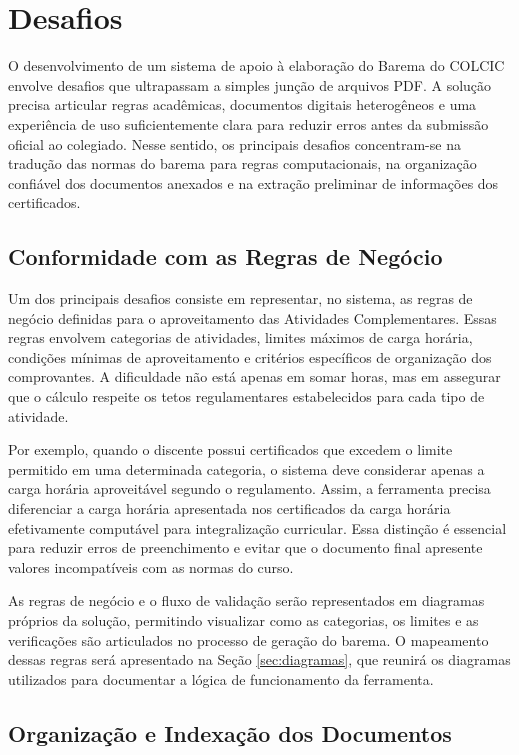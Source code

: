\section{Desafios}\label{sec:desafios}

O desenvolvimento de um sistema de apoio à elaboração do Barema do COLCIC envolve desafios que ultrapassam a simples junção de arquivos PDF. A solução precisa articular regras acadêmicas, documentos digitais heterogêneos e uma experiência de uso suficientemente clara para reduzir erros antes da submissão oficial ao colegiado. Nesse sentido, os principais desafios concentram-se na tradução das normas do barema para regras computacionais, na organização confiável dos documentos anexados e na extração preliminar de informações dos certificados.

\subsection{Conformidade com as Regras de Negócio}

Um dos principais desafios consiste em representar, no sistema, as regras de negócio definidas para o aproveitamento das Atividades Complementares. Essas regras envolvem categorias de atividades, limites máximos de carga horária, condições mínimas de aproveitamento e critérios específicos de organização dos comprovantes. A dificuldade não está apenas em somar horas, mas em assegurar que o cálculo respeite os tetos regulamentares estabelecidos para cada tipo de atividade.

Por exemplo, quando o discente possui certificados que excedem o limite permitido em uma determinada categoria, o sistema deve considerar apenas a carga horária aproveitável segundo o regulamento. Assim, a ferramenta precisa diferenciar a carga horária apresentada nos certificados da carga horária efetivamente computável para integralização curricular. Essa distinção é essencial para reduzir erros de preenchimento e evitar que o documento final apresente valores incompatíveis com as normas do curso.

As regras de negócio e o fluxo de validação serão representados em diagramas próprios da solução, permitindo visualizar como as categorias, os limites e as verificações são articulados no processo de geração do barema. O mapeamento dessas regras será apresentado na Seção \ref{sec:diagramas}, que reunirá os diagramas utilizados para documentar a lógica de funcionamento da ferramenta.

\subsection{Organização e Indexação dos Documentos}


